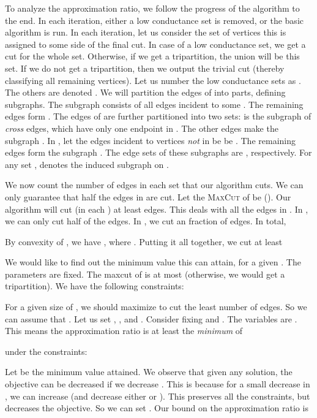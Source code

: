 \documentclass[11pt]{article}
\newenvironment{myproof}{\noindent {\sc Proof:}}{}
\def\maxcut{\textsc{MaxCut}\xspace}
\begin{document}
\begin{myproof} To analyze the approximation ratio, we follow the progress of the algorithm
to the end. In each iteration, either a low conductance set is removed,
or the basic algorithm is run. In each iteration, let us consider
the set of vertices this is assigned to some side of the final cut.
In case of a low conductance set, we get a cut for the whole set.
Otherwise, if we get a tripartition, the union 
will be this set. If we do not get a tripartition,
then we output the trivial cut (thereby classifying all remaining vertices).
Let us number the low conductance sets
as . The others are denoted .
We will partition the edges of  into parts, defining subgraphs.
The subgraph  consists of all edges incident to some
. The remaining edges form . The
edges of  are further partitioned into two sets:
 is the subgraph of \emph{cross} edges, which have only
one endpoint in . The other edges make the subgraph .
In , let the edges incident to vertices \emph{not} in
 be be . The remaining edges form the subgraph .
The edge sets of these subgraphs are ,
respectively. For any set ,  denotes
the induced subgraph on .

We now count the number of edges
in each set that our algorithm cuts. We can only
guarantee that half the edges in  are cut. Let the
\maxcut of  be  (). Our algorithm will
cut (in each ) at least  edges.
This deals with all the edges in . In , we can
only cut half of the edges. In , we cut an 
fraction of edges. In total,

By convexity of , we have
,
where . Putting it all together, we cut
at least

We would like to find out the minimum value this can attain, for a given
. The parameters  are fixed.
The maxcut of  is at most  (otherwise, we would
get a tripartition). We have the
following constraints:

For a given size of , we should maximize  to cut the least
number of edges. So we can assume that .
Let us set , , and .
Consider fixing  and . The variables are .
This means the approximation ratio is at least
the \emph{minimum} of

under the constraints:

Let  be the minimum value attained.
We observe that given any solution, the objective can
be decreased if we decrease . This is because for
a small decrease in , we can increase  (and decrease either  or ).
This preserves all the constraints, but decreases the objective.
So we can set .
Our bound on the approximation ratio is

\end{myproof}
\end{document}
